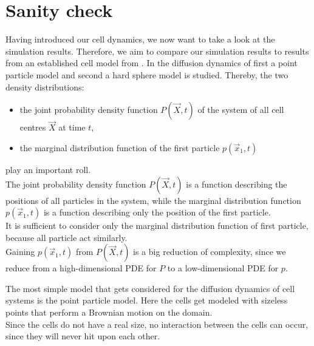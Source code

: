 \section{Sanity check}
Having introduced our cell dynamics, we now want to take a look at the simulation results.
Therefore, we aim to compare our simulation results to results from an established cell model from \cite{Bruna2012}. 
In \cite{Bruna2012} the diffusion dynamics of first a point particle model and second a hard sphere model is studied. 
Thereby, the two density distributions:
\begin{itemize}
    \item the joint probability density function $P(\vec{X}, t)$ of the system of all cell centres $\vec{X}$ at time $t$,
    \item the marginal distribution function of the first particle $p(\vec{x}_1, t)$
\end{itemize}
play an important roll. \\
The joint probability density function $P(\vec{X}, t)$ is a function describing the positions of all particles in the system, while the marginal distribution function $p(\vec{x}_1, t)$ is a function describing only the position of the first particle. \\
It is sufficient to consider only the marginal distribution function of first particle, because all particle act similarly. \\ 
Gaining $p(\vec{x}_1, t)$ from $P(\vec{X}, t)$ is a big reduction of complexity, since we reduce from a high-dimensional PDE for $P$ to a low-dimensional PDE for $p$. 

The most simple model that gets considered for the diffusion dynamics of cell systems is the point particle model. 
Here the cells get modeled with sizeless points that perform a Brownian motion on the domain. \\
Since the cells do not have a real size, no interaction between the cells can occur, since they will never hit upon each other.  

